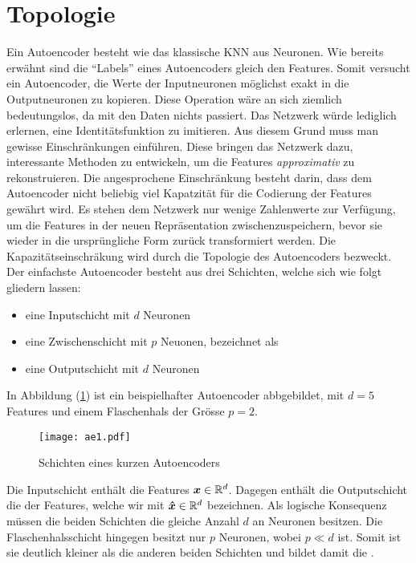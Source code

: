 \section{Topologie}
Ein Autoencoder besteht wie das klassische KNN aus Neuronen.
Wie bereits erwähnt sind die ``Labels'' eines Autoencoders gleich
den Features. Somit versucht ein Autoencoder, die Werte der Inputneuronen
möglichst exakt in die Outputneuronen zu kopieren.
Diese Operation wäre an sich ziemlich bedeutungslos, da mit den
Daten nichts passiert. Das Netzwerk würde lediglich erlernen, eine
Identitätsfunktion zu imitieren.
Aus diesem Grund muss man gewisse Einschränkungen einführen. Diese bringen das Netzwerk dazu,
interessante Methoden zu entwickeln, um die Features \textit{approximativ} zu rekonstruieren.
\para{}
Die angesprochene Einschränkung besteht darin, dass dem Autoencoder nicht
beliebig viel Kapatzität für die Codierung der Features gewährt wird.
Es stehen dem Netzwerk nur wenige Zahlenwerte zur Verfügung, um die Features
in der neuen Repräsentation zwischenzuspeichern, bevor sie wieder in die
ursprüngliche Form zurück transformiert werden.
Die Kapazitätseinschräkung wird durch die Topologie des Autoencoders bezweckt.
\para{}
\bigskip
Der einfachste Autoencoder besteht aus drei Schichten, welche sich wie folgt
gliedern lassen:
\begin{itemize}
\item{eine Inputschicht mit $d$ Neuronen}
\item{eine Zwischenschicht mit $p$ Neuonen, bezeichnet als }
\item{eine Outputschicht mit $d$ Neuronen}
\end{itemize}
In Abbildung (\ref{fig:basic_autoencoder}) ist
ein beispielhafter Autoencoder abbgebildet, mit $d = 5$ Features und einem
Flaschenhals der Grösse $p = 2$.
\begin{figure}[h!]
  \centering
  \texttt{[image: ae1.pdf]}
  \caption{Schichten eines kurzen Autoencoders}
  \label{fig:basic_autoencoder}
\end{figure}
\para{}
Die Inputschicht enthält die Features $\bm{x} \in \mathbb{R}^d$. Dagegen enthält die Outputschicht
die  der Features, welche wir mit $\bm{\hat{x}} \in \mathbb{R}^d$
bezeichnen. Als logische Konsequenz müssen die beiden Schichten die gleiche
Anzahl $d$ an Neuronen besitzen.
Die Flaschenhalsschicht hingegen besitzt nur $p$ Neuronen, wobei $p \ll d$ ist.
Somit ist sie deutlich kleiner als die anderen beiden Schichten und bildet
damit die .
